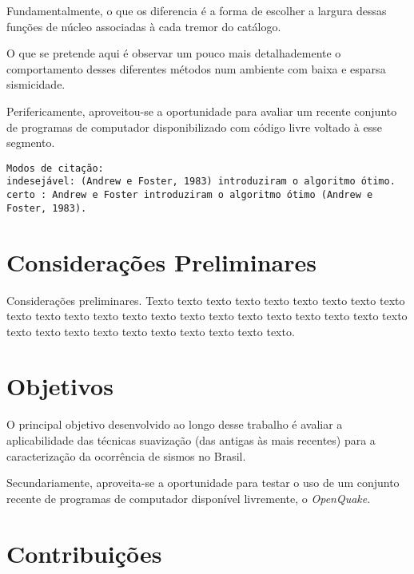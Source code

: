 Fundamentalmente, o que os diferencia é a forma de escolher a largura dessas
funções de núcleo associadas à cada tremor do catálogo.

O que se pretende aqui é observar um pouco mais detalhademente o comportamento
desses diferentes métodos num ambiente com baixa e esparsa sismicidade.

Perifericamente, aproveitou-se a oportunidade para avaliar um recente
conjunto de programas de computador disponibilizado com código livre voltado à
esse segmento.

\begin{small}
\begin{verbatim}
Modos de citação:
indesejável: (Andrew e Foster, 1983) introduziram o algoritmo ótimo.
certo : Andrew e Foster introduziram o algoritmo ótimo (Andrew e Foster, 1983).
\end{verbatim}
\end{small}



\section{Considerações Preliminares}
\label{sec:consideracoes_preliminares}

Considerações preliminares.
Texto texto texto texto texto texto texto texto texto texto texto texto texto
texto texto texto texto texto texto texto texto texto texto texto texto texto
texto texto texto texto texto texto texto.
 

\section{Objetivos}
\label{sec:objetivo}

O principal objetivo desenvolvido ao longo desse trabalho é avaliar a
aplicabilidade das técnicas suavização (das antigas às mais recentes) para a
caracterização da ocorrência de sismos no Brasil.

Secundariamente, aproveita-se a oportunidade para testar o uso de um conjunto
recente de programas de computador disponível livremente, o \emph{OpenQuake}. 

\section{Contribuições}
\label{sec:contribucoes}

